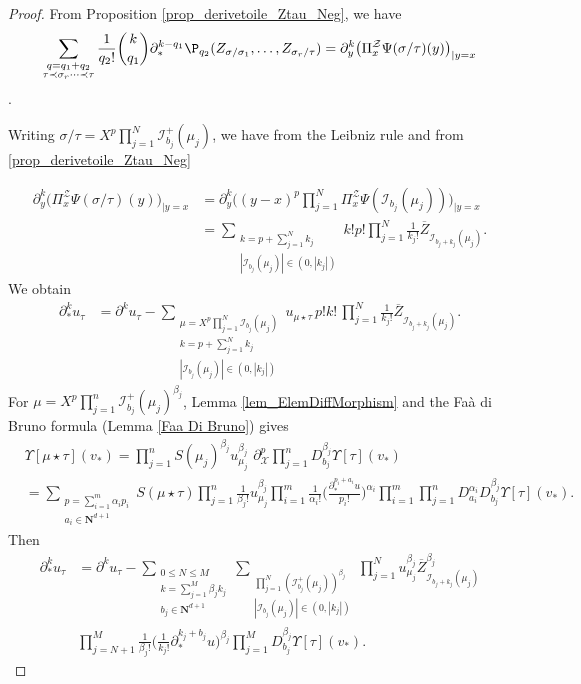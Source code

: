\documentclass[11pt]{preprint}
\newcommand{\mcI}{\mathcal{I}}
\newcommand{\mcX}{\mathcal{X}}
\newcommand{\mcZ}{\mathcal{Z}}
\newcommand{\bfN}{\mathbf{N}}
\begin{document}
\begin{proof}
		
	From Proposition \ref{prop_derivetoile_Ztau_Neg}, we have 
	$$\sum_{\substack{q=q_1+q_2\\ \tau\prec\sigma_r\dots\prec\tau }} \frac{1}{q_2!}\binom{k}{q_1}\partial^{k-q_1}_*\P_{q_2}(Z_{\sigma/\sigma_1},\dots,Z_{\sigma_r/\tau}) = \partial^k_y \big(\Pi_x^\mcZ \Psi(\sigma/\tau)(y)\big)_{|y=x}$$.
	
	
		
	Writing $\sigma/\tau = X^p \prod_{j=1}^{N} \mcI^+_{b_j}(\mu_j)$, we have from the Leibniz rule and from \ref{prop_derivetoile_Ztau_Neg}
	
	
	\begin{align*}
	\partial^k_y \Big( \Pi^\mcZ_x \Psi(\sigma/\tau) (y)  \Big)_{|y=x} &=
	 \partial^k_y\Big( (y-x)^p \prod_{j=1}^N \Pi^\mcZ_x \Psi(\mcI_{b_j}(\mu_j) ) \Big)_{|y=x}
	\\
	&= \sum_{\substack{k=p+\sum_{j=1}^N k_j \\ |\mcI_{b_j}(\mu_j)|\in(0,|k_j|) }} k! p! \prod_{j=1}^{N}\frac{1}{k_j!}\overline{Z}_{\mcI_{b_j+k_j}(\mu_j)}.
\end{align*}
We obtain 
		\begin{align*}
			\partial_*^{k} u_\tau  &= \partial^{k} u_\tau -\sum_{\substack{\mu=X^p\prod_{j=1}^N \mcI_{b_j}(\mu_j) \\ k=p+\sum_{j=1}^N k_j\\  |\mcI_{b_j}(\mu_j)|\in(0,|k_j|)}}  u_{\mu\star \tau} \, p!k! \, \prod_{j=1}^N \frac{1		}{k_j!} \overline Z_{\mcI_{b_j+k_j}(\mu_j) }.
		\end{align*}		
For $\mu=X^p\prod_{j=1}^n \mcI^+_{b_j}(\mu_j)^{\beta_j}$, Lemma \ref{lem_ElemDiffMorphism} and the Faà di Bruno formula (Lemma \ref{Faa Di Bruno}) gives   
\begin{align*}
& \Upsilon[\mu\star\tau](v_*) = \prod_{j=1}^n  S(\mu_j)^{\beta_j} u_{\mu_j}^{\beta_j} \, \, \partial^p_\mcX\prod_{j=1}^{n}  D_{b_j}^{\beta_j} \Upsilon[\tau](v_*)
\\
&= \sum_{\substack{p=\sum_{i=1}^m \alpha_i p_i  \\ a_i\in\bfN^{d+1}   }} S(\mu\star\tau)\prod_{j=1}^n  \frac{1}{\beta_j!}u_{\mu_j}^{\beta_j} \prod_{i=1}^m \frac{1}{\alpha_i !} \Big(\frac{\partial_*^{p_i+a_i} u}{p_i !}\Big)^{\alpha_i}    \prod_{i=1}^m\prod_{j=1}^{n}D_{a_i}^{\alpha_i} D_{b_j}^{\beta_j} \Upsilon[\tau](v_*).
\end{align*}	
Then 
		\begin{align*}
			\partial^k_*u_\tau&=\partial^{k} u_\tau - \sum_{ \substack{ 0\leq N\leq M  \\ k=\sum_{j=1}^M \beta_j k_j \\     b_j\in\bfN^{d+1}}}   \sum_{\substack{\prod_{j=1}^N (\mcI^+_{b_j}(\mu_j))^{\beta_j} \\|\mcI_{b_j}(\mu_j)|\in(0,|k_j|)  }} \prod_{j=1}^N  u_{\mu_j}^{\beta_j}\overline Z_{\mcI_{b_j+k_j}(\mu_j)}^{\beta_j} \\&\prod_{j=N+1}^M  \frac{1}{\beta_j!}\Big(\frac{1}{k_j!}\partial_*^{k_j+b_j} u\Big)^{\beta_j}  \prod_{j=1}^{M} D_{b_j}^{\beta_j} \Upsilon[\tau](v_*).

\end{align*}
\end{proof}
\end{document}

